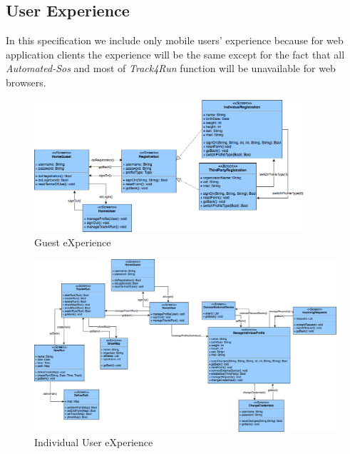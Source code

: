 \documentclass[a4paper]{article}
\begin{document}
\subsection{User Experience}
    In this specification we include only mobile users' experience because for web application clients the experience will be the same except for the fact that all \textit{Automated-Sos} and most of \textit{Track4Run} function will be unavailable for web browsers.
    \begin{figure}[!htpb]
    	\centering
    	\includegraphics[width=100mm]{images/ux/UX_Guest.png}
    	\caption{Guest eXperience}
    \end{figure}

    \begin{figure}[!htpb]
        \centering
    	\includegraphics[width=\textwidth]{images/ux/UX_Individual.png}
    	\caption{Individual User eXperience}
    \end{figure}
\end{document}

